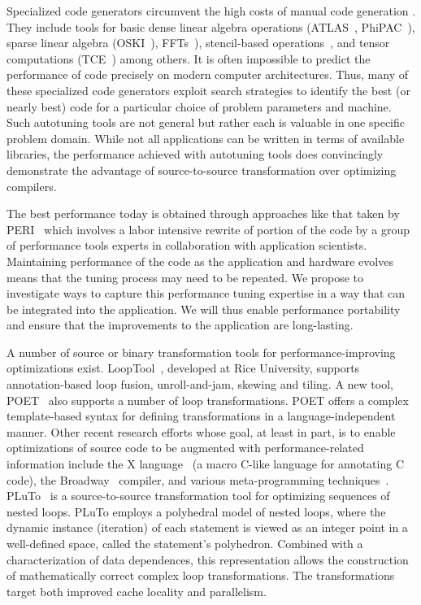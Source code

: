 \documentclass[11pt]{article}
\begin{document}
Specialized code generators circumvent the high costs of manual code generation . They include tools for basic dense linear algebra operations (ATLAS~\cite{WN147}, PhiPAC~\cite{bilmes97optimizing,phipacwww}), sparse linear algebra (OSKI~\cite{vuduc05}), FFTs~\cite{FFTW,Spiral}), stencil-based operations~\cite{kamil06}, and tensor computations (TCE~\cite{TCE}) among others.  It is often impossible to predict the performance of code precisely on modern computer architectures. Thus, many of these specialized code generators exploit search strategies to identify the best (or nearly best) code for a particular choice of problem parameters and machine. Such autotuning tools are not general but rather each is valuable in one specific problem domain. While not all applications can be written in terms of available libraries, the performance achieved with autotuning tools does convincingly demonstrate the advantage of source-to-source transformation over optimizing compilers.

The best performance today is obtained through approaches like that taken by PERI~\cite{PERI} which involves a labor intensive rewrite of portion of the code by a group of performance tools experts in collaboration with application scientists. Maintaining performance of the code as the application and hardware evolves means that the tuning process may need to be repeated. We propose to investigate ways to capture this performance tuning expertise in a way that can be integrated into the application. We will thus enable performance portability and ensure that the improvements to the application are long-lasting.

A number of source or binary transformation tools for performance-improving optimizations exist. LoopTool~\cite{LoopTool}, developed at Rice University, supports annotation-based loop fusion, unroll-and-jam, skewing and tiling.  A new tool, POET~\cite{POET} also supports a number of loop transformations. POET offers a complex template-based syntax for defining transformations in a language-independent manner. Other recent research efforts whose goal, at least in part, is to enable optimizations of source code to be augmented with performance-related information include the X language~\cite{XLanguage} (a macro C-like language for annotating C code), the Broadway~\cite{broadway} compiler, and various meta-programming techniques~\cite{veldhuizen95,weise93,kiczales91,chiba95}. PLuTo~\cite{Pluto,uday08cc} is a source-to-source transformation tool for optimizing sequences of nested loops. PLuTo employs a polyhedral model of nested loops, where the dynamic instance (iteration) of each statement is viewed as an integer point in a well-defined space, called the statement's polyhedron. Combined with a characterization of data dependences, this representation allows the construction of mathematically correct complex loop transformations. The transformations target both improved cache locality and parallelism.
\end{document}
